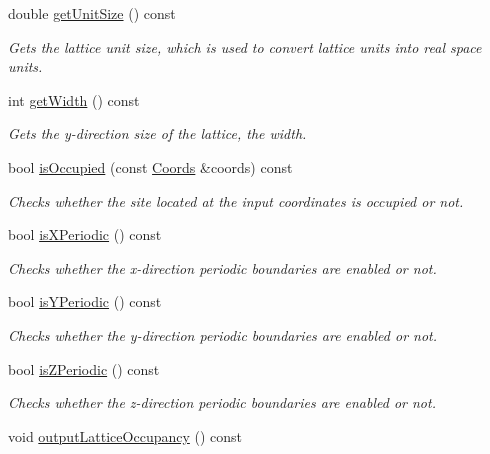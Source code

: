 \begin{DoxyCompactItemize}
double \hyperlink{class_lattice_ac6963a6b2b4b8d96d3417f6e9c2a509d}{get\+Unit\+Size} () const
\begin{DoxyCompactList}\small\item\em Gets the lattice unit size, which is used to convert lattice units into real space units. \end{DoxyCompactList}\item 
int \hyperlink{class_lattice_aeb60d2b8bfb02d9da8bef463f0d41428}{get\+Width} () const
\begin{DoxyCompactList}\small\item\em Gets the y-\/direction size of the lattice, the width. \end{DoxyCompactList}\item 
bool \hyperlink{class_lattice_a4d37afb6ad4c67f4f6462c2f6d5c337d}{is\+Occupied} (const \hyperlink{struct_coords}{Coords} \&coords) const
\begin{DoxyCompactList}\small\item\em Checks whether the site located at the input coordinates is occupied or not. \end{DoxyCompactList}\item 
bool \hyperlink{class_lattice_accf3b995e0d0cb422907728a29b1b523}{is\+X\+Periodic} () const
\begin{DoxyCompactList}\small\item\em Checks whether the x-\/direction periodic boundaries are enabled or not. \end{DoxyCompactList}\item 
bool \hyperlink{class_lattice_ac3192acefb019c5258143a6c758b3e48}{is\+Y\+Periodic} () const
\begin{DoxyCompactList}\small\item\em Checks whether the y-\/direction periodic boundaries are enabled or not. \end{DoxyCompactList}\item 
bool \hyperlink{class_lattice_ad7dd1b12a253e506aba5cedb57bf86ea}{is\+Z\+Periodic} () const
\begin{DoxyCompactList}\small\item\em Checks whether the z-\/direction periodic boundaries are enabled or not. \end{DoxyCompactList}\item 
\mbox{\label{class_lattice_aa1f65735ecbd750ec04b6413b4d47316}} 
void \hyperlink{class_lattice_aa1f65735ecbd750ec04b6413b4d47316}{output\+Lattice\+Occupancy} () const

\end{DoxyCompactItemize}
